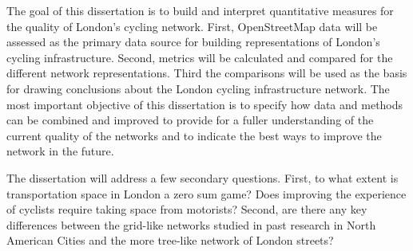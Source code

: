 The goal of this dissertation is to build and interpret quantitative measures for the quality of London's cycling network. First, OpenStreetMap data will be assessed as the primary data source for building representations of London's cycling infrastructure. Second, metrics will be calculated and compared for the different network representations. Third the comparisons will be used as the basis for drawing conclusions about the London cycling infrastructure network. The most important objective of this dissertation is to specify how data and methods can be combined and improved to provide for a fuller understanding of the current quality of the networks and to indicate the best ways to improve the network in the future. 

The dissertation will address a few secondary questions. First, to what extent is transportation space in London a zero sum game? Does improving the experience of cyclists require taking space from motorists? Second, are there any key differences between the grid-like networks studied in past research in North American Cities and the more tree-like network of London streets? 

%
%
%
%

